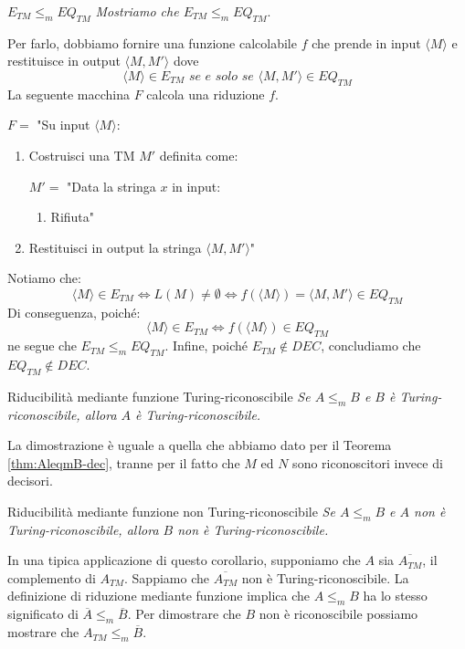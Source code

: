 \begin{Example}{$E_{TM}\leq_m EQ_{TM}$}{}
\textit{Mostriamo che $E_{TM}\leq_m EQ_{TM}$}.

Per farlo, dobbiamo fornire una funzione calcolabile $f$ che prende in input $\langle M\rangle$ e restituisce in output $\langle M, M'\rangle$ dove
\begin{equation*}
\langle M\rangle\in E_{TM} \textit{ se e solo se } \langle M, M'\rangle\in EQ_{TM}
\end{equation*}
La seguente macchina $F$ calcola una riduzione $f$.

$F=$ "Su input $\langle M\rangle$:
\begin{enumerate}
    \item Costruisci una TM $M'$ definita come:

    $M' =$ "Data la stringa $x$ in input:
    \begin{enumerate}
        \item Rifiuta"
    \end{enumerate}
    \item Restituisci in output la stringa $\langle M, M'\rangle$"
\end{enumerate}

Notiamo che:
\begin{equation*}
\langle M\rangle\in E_{TM}\iff L(M)\neq\emptyset\iff f(\langle M\rangle)=\langle M, M'\rangle\in EQ_{TM}
\end{equation*}
Di conseguenza, poiché:
\begin{equation*}
    \langle M\rangle\in E_{TM}\iff f(\langle M\rangle)\in EQ_{TM}
\end{equation*}
ne segue che $E_{TM}\leq_m EQ_{TM}$. Infine, poiché $E_{TM}\notin DEC$, concludiamo che $EQ_{TM}\notin DEC$.
\end{Example}

\begin{Thm}{Riducibilità mediante funzione Turing-riconoscibile}{}
\textit{Se $A\leq_m B$ e $B$ è Turing-riconoscibile, allora $A$ è Turing-riconoscibile.}

La dimostrazione è uguale a quella che abbiamo dato per il Teorema \ref{thm:AleqmB-dec}, tranne per il fatto che $M$ ed $N$ sono riconoscitori invece di decisori. 
\end{Thm}

\begin{Corollario}{Riducibilità mediante funzione non Turing-riconoscibile}{}
\textit{Se $A\leq_m B$ e $A$ non è Turing-riconoscibile, allora $B$ non è Turing-riconoscibile.}

In una tipica applicazione di questo corollario, supponiamo che $A$ sia $\overline{A_{TM}}$, il complemento di $A_{TM}$. Sappiamo che $\overline{A_{TM}}$ non è Turing-riconoscibile. La definizione di riduzione mediante funzione implica che $A\leq_m B$ ha lo stesso significato di $\overline{A}\leq_m\overline{B}$. Per dimostrare che $B$ non è riconoscibile possiamo mostrare che $A_{TM}\leq_m\overline{B}$.
\end{Corollario}


